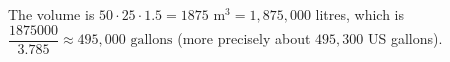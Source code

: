 The volume is $50\cdot25\cdot1.5=1875$ m$^3=1{,}875{,}000$ litres, which is $\dfrac{1875000}{3.785}\approx\boxed{495{,}000\text{ gallons}}$ (more precisely about $495{,}300$ US gallons).
